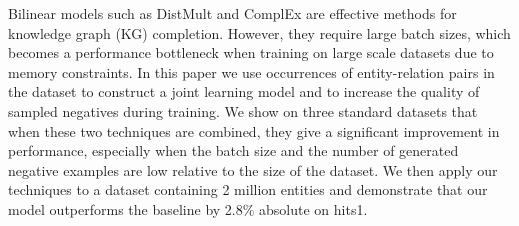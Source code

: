 Bilinear models such as DistMult and ComplEx are effective methods for knowledge graph (KG) completion. However, they require large batch sizes, which becomes a performance bottleneck when training on large scale datasets due to memory constraints. 
In this paper we use occurrences of entity-relation pairs in the dataset to construct a joint learning model and to increase the quality of sampled negatives during training. We show on three standard datasets that when these two techniques are combined, they give a significant improvement in performance, especially when the batch size and the number of generated negative examples are low relative to the size of the dataset. We then apply our techniques to a dataset containing 2 million entities and demonstrate that our model outperforms the baseline by 2.8\% absolute on hits\@1.